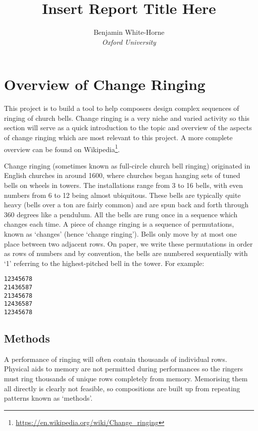 \documentclass[12pt]{article}
\title{Insert Report Title Here}
\author{Benjamin White-Horne \\ \emph{Oxford University}}
\newcommand{\br}[0]{\vspace{10pt} \noindent}
\newcommand{\footurl}[1]{\footnote{\url{#1}}}
\begin{document}
\maketitle
\pagebreak

\tableofcontents
\pagebreak

\section{Overview of Change Ringing}

This project is to build a tool to help composers design complex sequences of ringing of church
bells.  Change ringing is a very niche and varied activity so this section will serve as a quick
introduction to the topic and overview of the aspects of change ringing which are most relevant to
this project.  A more complete overview can be found
on Wikipedia\footurl{https://en.wikipedia.org/wiki/Change_ringing}.

\br{}Change ringing (sometimes known as full-circle church bell ringing) originated in English
churches in around 1600, where churches began hanging sets of tuned bells on wheels in towers.
The installations range from 3 to 16 bells, with even numbers from 6 to 12 being almost ubiquitous.
These bells are typically quite heavy (bells over a ton are fairly common) and are spun
back and forth through 360 degrees like a pendulum.  All the bells are rung once in a sequence which
changes each time.  A piece of change ringing is a sequence of permutations, known as `changes'
(hence `change ringing').  Bells only move by at most one place between two adjacent rows.  On
paper, we write these permutations in order as rows of numbers and by convention, the bells
are numbered sequentially with `1' referring to the highest-pitched bell in the tower.  For
example:

\begin{verbatim}
12345678
21436587
21345678
12436587
12345678
\end{verbatim}

\subsection{Methods}
A performance of ringing will often contain thousands of individual rows.  Physical aids to memory
are not permitted during performances so the ringers must ring thousands of unique rows completely
from memory.  Memorising them all directly is clearly not feasible, so compositions are built up
from repeating patterns known as `methods'.
\end{document}
